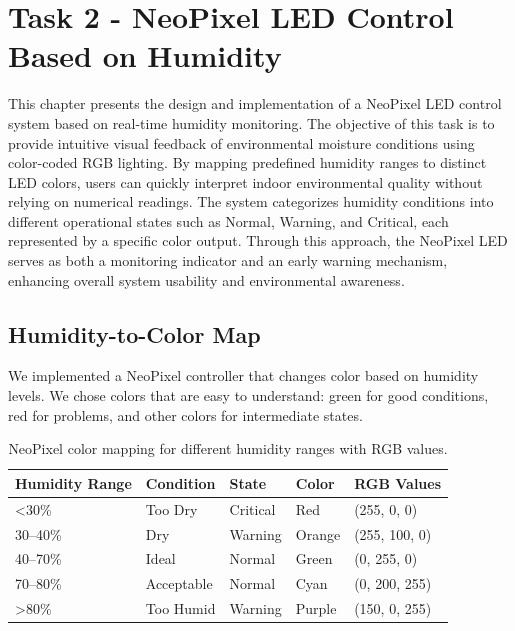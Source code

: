 
\chapter{Task 2 - NeoPixel LED Control Based on Humidity}

This chapter presents the design and implementation of a NeoPixel LED control system based on real-time humidity monitoring. The objective of this task is to provide intuitive visual feedback of environmental moisture conditions using color-coded RGB lighting. By mapping predefined humidity ranges to distinct LED colors, users can quickly interpret indoor environmental quality without relying on numerical readings. The system categorizes humidity conditions into different operational states such as Normal, Warning, and Critical, each represented by a specific color output. Through this approach, the NeoPixel LED serves as both a monitoring indicator and an early warning mechanism, enhancing overall system usability and environmental awareness.

\newpage

\section{Humidity-to-Color Map}

We implemented a NeoPixel controller that changes color based on humidity levels. We chose colors that are easy to understand: green for good conditions, red for problems, and other colors for intermediate states.

\begin{table}[H]
\centering
\caption{NeoPixel color mapping for different humidity ranges with RGB values.}
\label{tab:humidity_colors}
\begin{tabular}{|l|l|l|l|l|}
\hline
\textbf{Humidity Range} & \textbf{Condition} & \textbf{State} & \textbf{Color} & \textbf{RGB Values} \\
\hline
\textless 30\% & Too Dry & Critical & Red & (255, 0, 0) \\
\hline
30--40\% & Dry & Warning & Orange & (255, 100, 0) \\
\hline
40--70\% & Ideal & Normal & Green & (0, 255, 0) \\
\hline
70--80\% & Acceptable & Normal & Cyan & (0, 200, 255) \\
\hline
\textgreater 80\% & Too Humid & Warning & Purple & (150, 0, 255) \\
\hline
\end{tabular}
\end{table}

